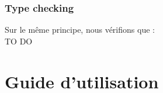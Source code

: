 \documentclass[a4paper,10pt]{article}
\begin{document}
	\subsubsection{Type checking}
		Sur le même principe, nous vérifions que :\\
		
		TO DO


\section{Guide d'utilisation}
\end{document}
